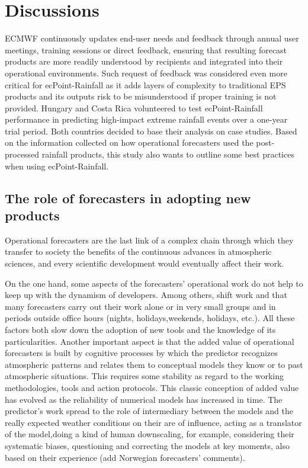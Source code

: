 \documentclass[twocol]{ametsocV5} %
\begin{document}
\section{Discussions}

ECMWF continuously updates end-user needs and feedback through annual user meetings, training sessions or direct feedback, ensuring that resulting forecast products are more readily understood by recipients and integrated into their operational environments. Such request of feedback was considered even more critical for ecPoint-Rainfall as it adds layers of complexity to traditional EPS products and its outputs risk to be misunderstood if proper training is not provided. Hungary and Costa Rica volunteered to test ecPoint-Rainfall performance in predicting high-impact extreme rainfall events over a one-year trial period. Both countries decided to base their analysis on case studies. Based on the information collected on how operational forecasters used the post-processed rainfall products, this study also wants to outline some best practices when using ecPoint-Rainfall.  


\subsection{The role of forecasters in adopting new products}
Operational forecasters are the last link of a complex chain through which they transfer to society the benefits of the continuous advances in atmospheric sciences, and every scientific development would eventually affect their work.

On the one hand, some aspects of the forecasters' operational work do not help to keep up with the dynamism of developers. Among others, shift work and that many forecasters carry out their work alone or in very small groups and in periods outside office hours (nights, holidays,weekends, holidays, etc.). All these factors both slow down the adoption of new tools and the knowledge of its particularities. Another important aspect is that the added value of operational forecasters is built by cognitive processes by which the predictor recognizes atmospheric patterns and relates them to conceptual models they know or to past atmospheric situations. This requires some stability as regard to the working methodologies, tools and action protocols. This classic conception of added value has evolved as the reliability of numerical models has increased in time. The predictor's work spread to the role of intermediary between the models and the really expected weather conditions on their are of influence, acting as a translator of the model,doing a kind of human downscaling, for example, considering their systematic biases, questioning and correcting the models at key moments, also based on their experience (add Norwegian forecasters' comments).
\end{document}
